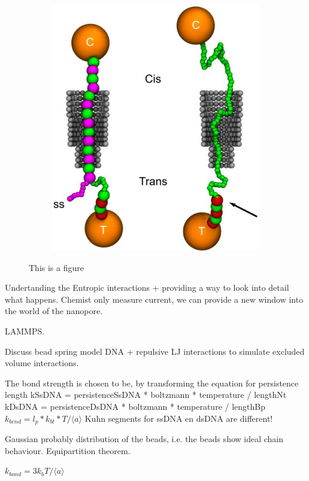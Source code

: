 \begin{figure}[ht]
\begin{centering}
\begin{subfigure}[t]{\dimexpr.5\linewidth-1.3em\relax}
  \includegraphics[width=0.9\linewidth,valign=t]{Figures/Stefanos2.png}
  \end{subfigure}
  \caption{This is a figure}
  \label{fig:test}
  \end{centering}
\end{figure}


Undertanding the Entropic interactions + providing a way to look into detail what
happens. Chemist only measure current, we can provide a new window into the world of the
nanopore.

LAMMPS.

Discuss bead spring model DNA + repulsive LJ interactions to simulate excluded volume
interactions.

The bond strength is chosen to be, by transforming the equation for persistence length
kSsDNA = persistenceSsDNA * boltzmann * temperature / lengthNt
kDsDNA = persistenceDsDNA * boltzmann * temperature / lengthBp
$k_{bend} = l_p * k_{bt} * T / \langle a \rangle$
Kuhn segments for ssDNA en dsDNA are different!

Gaussian probably distribution of the beads, i.e. the beads show ideal chain behaviour.
Equipartition theorem.

$k_{bond} = 3 k_b T / \langle a \rangle$

